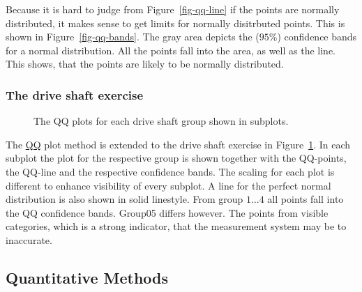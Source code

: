 \documentclass[
  a4paper,
]{scrbook}
\begin{document}
Because it is hard to judge from Figure~\ref{fig-qq-line} if the points
are normally distributed, it makes sense to get limits for normally
disitrbuted points. This is shown in Figure~\ref{fig-qq-bands}. The gray
area depicts the (\(95\%\)) confidence bands for a normal distribution.
All the points fall into the area, as well as the line. This shows, that
the points are likely to be normally distributed.

\subsubsection{The drive shaft
exercise}\label{the-drive-shaft-exercise-1}

\begin{figure}[H]


\caption{\label{fig-qq-ds}The QQ plots for each drive shaft group shown
in subplots.}

\end{figure}%

The \hyperref[qq]{QQ} plot method is extended to the drive shaft
exercise in Figure~\ref{fig-qq-ds}. In each subplot the plot for the
respective group is shown together with the QQ-points, the QQ-line and
the respective confidence bands. The scaling for each plot is different
to enhance visibility of every subplot. A line for the perfect normal
distribution is also shown in solid linestyle. From group \(1 \ldots 4\)
all points fall into the QQ confidence bands. Group05 differs however.
The points from visible categories, which is a strong indicator, that
the measurement system may be to inaccurate.

\subsection{Quantitative Methods}\label{sec-ks-test}
\end{document}
